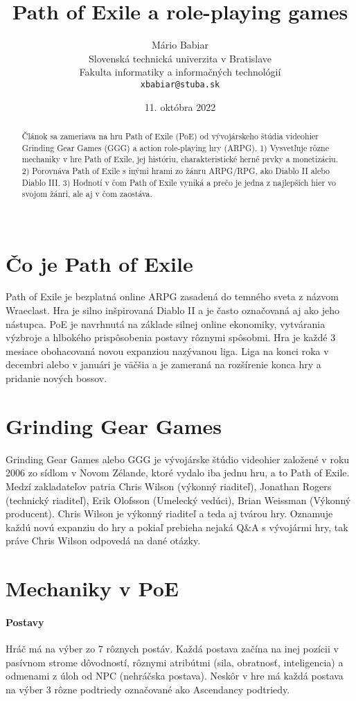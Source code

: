 \documentclass[10pt,twoside,slovak,a4paper]{article}
\title{Path of Exile a role-playing games}
\author{Mário Babiar\\[2pt]
	{\small Slovenská technická univerzita v Bratislave}\\
	{\small Fakulta informatiky a informačných technológií}\\
	{\small \texttt{xbabiar@stuba.sk}}
	}
\date{\small 11. októbra 2022}
\begin{document}
\maketitle

\begin{abstract}
Článok sa zameriava na hru Path of Exile (PoE) od vývojárskeho štúdia videohier Grinding Gear Games (GGG) a action role-playing hry (ARPG). 1) Vysvetľuje rôzne mechaniky v hre Path of Exile, jej históriu, charakteristické herné prvky a monetizáciu. 2) Porovnáva Path of Exile s inými hrami zo žánru ARPG/RPG, ako Diablo II alebo Diablo III. 3) Hodnotí v čom Path of Exile vyniká a prečo je jedna z najlepších hier vo svojom žánri, ale aj v čom zaostáva.\\\\
\end{abstract}
 
\section{Čo je Path of Exile}
Path of Exile je bezplatná online ARPG zasadená do temného sveta z názvom Wraeclast. Hra je silno inšpirovaná Diablo II a je často označovaná aj ako jeho nástupca. PoE je navrhnutá na základe silnej online ekonomiky, vytvárania výzbroje a hlbokého prispôsobenia postavy rôznymi spôsobmi. Hra je každé 3 mesiace obohacovaná novou expanziou nazývanou liga. Liga na konci roka v decembri alebo v januári je väčšia a je zameraná na rozšírenie konca hry a pridanie nových bossov.

\section{Grinding Gear Games}
Grinding Gear Games alebo GGG je vývojárske štúdio videohier založené v roku 2006 zo sídlom v Novom Zélande, ktoré vydalo iba jednu hru, a to Path of Exile. Medzí zakladateľov patria Chris Wilson (výkonný riaditeľ), Jonathan Rogers (technický riaditeľ), Erik Olofsson (Umelecký vedúci), Brian Weissman (Výkonný producent). Chris Wilson je výkonný riaditeľ a teda aj tvárou hry. Oznamuje každú novú expanziu do hry a pokiaľ prebieha nejaká Q\&A s vývojármi hry, tak práve Chris Wilson odpovedá na dané otázky.

\section{Mechaniky v PoE}
\paragraph{Postavy}
Hráč má na výber zo 7 rôznych postáv. Každá postava začína na inej pozícii v pasívnom strome dôvodností, rôznymi atribútmi (sila, obratnosť, inteligencia) a odmenami z úloh od NPC (nehráčska postava). Neskôr v hre má každá postava na výber 3 rôzne podtriedy označované ako Ascendancy podtriedy.\cite{PoE-offisite-classes}
\end{document}

